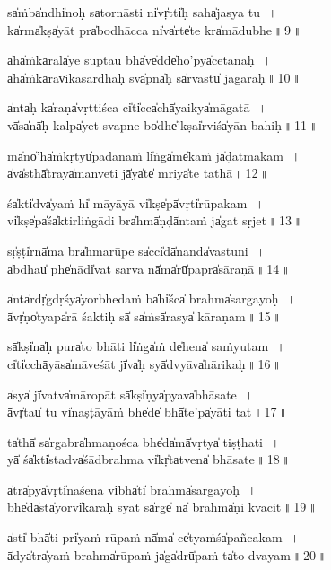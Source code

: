 \documentclass[parskip, 12pt, DIV=16, pagenumber=head,top, enableddeprecatedfontcommands]{scrartcl}
\begin{document}
\newpage

sa̍ṁba̍ndhi̍noḥ sa̍tornā॒sti ni̍vṛ̍tti̍ḥ saha̍jasya॒ tu॒\,~।\\
ka̍rma̍kṣa̍yāt pra̍bodhā॒cca ni̍va̍rte̍te kra̍mādu॒bhe॒\,॥\,9\,॥

a̍ha̍ṁkā̍rala̍ye su॒ptau bha̍ve̍dde̍ho'pya̍ceta॒na॒ḥ॒\,~।\\
a̍ha̍ṁkā̍rav̍ikāsā॒rdhaḥ sva̍pna̍ḥ sa̍rvastu̍ jāga॒ra॒ḥ॒\,॥\,10\,॥

a̍nta̍ḥ ka̍raṇa̍vṛtti॒śca ci̍ti̍cca̍chā̍yaikya̍māga॒tā॒\,~।\\
vā̍sa̍nā̍ḥ kalpa̍yet sva॒pne bo̍dhe̍'kṣai̍rviśa̍yān ba॒hi॒ḥ॒\,॥\,11\,॥

ma̍no̍'ha̍ṁkṛtyu̍pādā॒naṁ li̍ṅga̍me̍kaṁ ja̍ḍātma॒ka॒m\,~।\\
a̍va̍sthā̍traya̍manve॒ti jā̍ya̍te̍ mriya̍te ta॒thā॒\,॥\,12\,॥


śa̍kti̍dva̍yaṁ hi̍ māyā॒yā vi̍kṣe̍pā̍vṛti̍rūpa॒ka॒m\,~।\\
vi̍kṣe̍pa̍śa̍kti॒rliṅgā॒di bra̍hmā̍ṇḍā̍ntaṁ ja̍gat sṛ॒je॒t॒\,॥\,13\,॥

sṛ̍ṣṭi̍rnā̍ma bra̍hmarū॒pe sa̍cci̍dā̍nanda̍vastu॒ni॒\,~।\\
a̍bdhau̍ phe̍nādi̍vat sa॒rva nā̍ma̍rū̍papra̍sāra॒ṇā॒\,॥\,14\,॥

a̍nta̍rdṛ̍gdṛśya̍yorbhe॒daṁ ba̍hi̍śca̍ brahma̍sarga॒yo॒ḥ॒\,~।\\
ā̍vṛ̍ṇo̍tyapa̍rā śa॒ktiḥ sā̍ sa̍ṁsā̍rasya̍ kāra॒ṇa॒m\,॥\,15\,॥

sā̍kṣi̍na̍ḥ pura̍to bhā॒ti li̍ṅga̍ṁ de̍hena̍ saṁyu॒ta॒m\,~।\\
ci̍ti̍cchā̍yāsa̍māve॒śāt jī̍va̍ḥ syā̍dvyāva̍hāri॒ka॒ḥ॒\,॥\,16\,॥

a̍sya̍ jī̍vatva̍māro॒pāt sā̍kṣi̍ṇya̍pyava̍bhāsa॒te॒\,~।\\
ā̍vṛ̍tau̍ tu vi̍naṣṭā॒yāṁ bhe̍de̍ bhā̍te'pa̍yāti॒ ta॒t॒\,॥\,17\,॥

ta̍thā̍ sa̍rgabra̍hmaṇo॒śca bhe̍da̍mā̍vṛtya̍ tiṣṭha॒ti॒\,~।\\
yā̍ śa̍kti̍stadva̍śādbra॒hma vi̍kṛ̍ta̍tvena̍ bhāsa॒te॒\,॥\,18\,॥

a̍trā̍pyā̍vṛti̍nāśe॒na vi̍bhā̍ti̍ brahma̍sarga॒yo॒ḥ॒\,~।\\
bhe̍da̍sta̍yorvi̍kāra॒ḥ syāt sa̍rge̍ na̍ brahma̍ṇi kva॒ci॒t॒\,॥\,19\,॥

\newpage

a̍sti̍ bhā̍ti pri̍yaṁ rū॒paṁ nā̍ma̍ ce̍tyaṁśa̍pañca॒ka॒m\,~।\\
 ā̍dya̍tra̍yaṁ brahma̍rū॒paṁ  ja̍ga̍drū̍paṁ ta̍to dva॒ya॒m\,॥\,20\,॥
\end{document}
